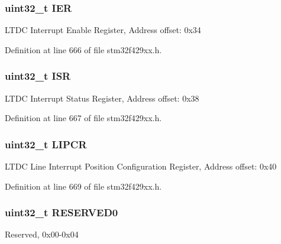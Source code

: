 \subsubsection[{\texorpdfstring{I\+ER}{IER}}]{ uint32\+\_\+t I\+ER}\hypertarget{struct_l_t_d_c___type_def_a6566f8cfbd1d8aa7e8db046aa35e77db}{}\label{struct_l_t_d_c___type_def_a6566f8cfbd1d8aa7e8db046aa35e77db}
L\+T\+DC Interrupt Enable Register, Address offset\+: 0x34 

Definition at line 666 of file stm32f429xx.\+h.

\subsubsection[{\texorpdfstring{I\+SR}{ISR}}]{ uint32\+\_\+t I\+SR}\hypertarget{struct_l_t_d_c___type_def_ab3c49a96815fcbee63d95e1e74f20e75}{}\label{struct_l_t_d_c___type_def_ab3c49a96815fcbee63d95e1e74f20e75}
L\+T\+DC Interrupt Status Register, Address offset\+: 0x38 

Definition at line 667 of file stm32f429xx.\+h.

\subsubsection[{\texorpdfstring{L\+I\+P\+CR}{LIPCR}}]{ uint32\+\_\+t L\+I\+P\+CR}\hypertarget{struct_l_t_d_c___type_def_a7d311d182e9cb4a5acd25f6bb3e1422d}{}\label{struct_l_t_d_c___type_def_a7d311d182e9cb4a5acd25f6bb3e1422d}
L\+T\+DC Line Interrupt Position Configuration Register, Address offset\+: 0x40 

Definition at line 669 of file stm32f429xx.\+h.

\subsubsection[{\texorpdfstring{R\+E\+S\+E\+R\+V\+E\+D0}{RESERVED0}}]{\setlength{\rightskip}{0pt plus 5cm}uint32\+\_\+t R\+E\+S\+E\+R\+V\+E\+D0}\hypertarget{struct_l_t_d_c___type_def_af2c92c7cb13569aaff6b4f5a25de5056}{}\label{struct_l_t_d_c___type_def_af2c92c7cb13569aaff6b4f5a25de5056}
Reserved, 0x00-\/0x04 

